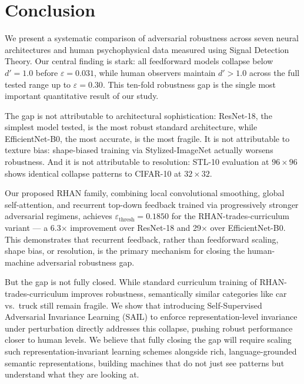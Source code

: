 \documentclass[12pt,a4paper]{article}
\begin{document}
\section{Conclusion}
\label{sec:conclusion}

We present a systematic comparison of adversarial robustness across
seven neural architectures and human psychophysical data measured using
Signal Detection Theory. Our central finding is stark: all feedforward
models collapse below $d'{=}1.0$ before $\varepsilon{=}0.031$, while
human observers maintain $d'{>}1.0$ across the full tested range up to
$\varepsilon{=}0.30$. This ten-fold robustness gap is the single most
important quantitative result of our study.

The gap is not attributable to architectural sophistication: ResNet-18,
the simplest model tested, is the most robust standard architecture,
while EfficientNet-B0, the most accurate, is the most fragile. It is
not attributable to texture bias: shape-biased training via
Stylized-ImageNet actually worsens robustness. And it is not
attributable to resolution: STL-10 evaluation at $96{\times}96$
shows identical collapse patterns to CIFAR-10 at $32{\times}32$.

Our proposed RHAN family, combining local convolutional smoothing, global
self-attention, and recurrent top-down feedback trained via progressively
stronger adversarial regimens, achieves $\varepsilon_{\text{thresh}}{=}0.1850$
for the RHAN-trades-curriculum variant --- a 6.3$\times$ improvement over
ResNet-18 and 29$\times$ over EfficientNet-B0. This demonstrates that
recurrent feedback, rather than feedforward scaling, shape bias,
or resolution, is the primary mechanism for closing the human-machine
adversarial robustness gap.

But the gap is not fully closed. While standard curriculum training of RHAN-trades-curriculum improves robustness, semantically similar categories like car vs.\ truck still remain fragile. We show that introducing Self-Supervised Adversarial Invariance Learning (SAIL) to enforce representation-level invariance under perturbation directly addresses this collapse, pushing robust performance closer to human levels. We believe that fully closing the gap will require scaling such representation-invariant learning schemes alongside rich, language-grounded semantic representations, building machines that do not just see patterns but understand what they are looking at.
\end{document}
